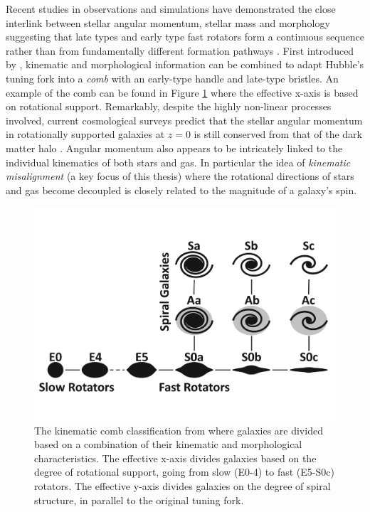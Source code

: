 Recent studies in observations and simulations have demonstrated the close interlink between stellar angular momentum, stellar mass and morphology suggesting that late types and early type fast rotators form a continuous sequence rather than from fundamentally different formation pathways \citep[][]{cortese2016, lagos2017, graham2018}. First introduced by \citet{cappellari2011}, kinematic and morphological information can be combined to adapt Hubble's tuning fork into a \textit{comb} with an early-type handle and late-type bristles. An example of the comb can be found in Figure \ref{fig:ifu_comb} where the effective x-axis is based on rotational support. Remarkably, despite the highly non-linear processes involved, current cosmological surveys predict that the stellar angular momentum in rotationally supported galaxies at $z=0$ is still conserved from that of the dark matter halo \citep[e.g.][]{genel2015}. Angular momentum also appears to be intricately linked to the individual kinematics of both stars and gas. In particular the idea of \textit{kinematic misalignment} (a key focus of this thesis) where the rotational directions of stars and gas become decoupled is closely related to the magnitude of a galaxy's spin.

\begin{figure}
	\includegraphics[width=\linewidth]{thesis/latex/introduction/ifu_comb.pdf}
	\vspace{-3em}
    \caption{The kinematic comb classification from \citet{cappellari2011} where galaxies are divided based on a combination of their kinematic and morphological characteristics. The effective x-axis divides galaxies based on the degree of rotational support, going from slow (E0-4) to fast (E5-S0c) rotators. The effective y-axis divides galaxies on the degree of spiral structure, in parallel to the original tuning fork.}
    \label{fig:ifu_comb}
\end{figure}

